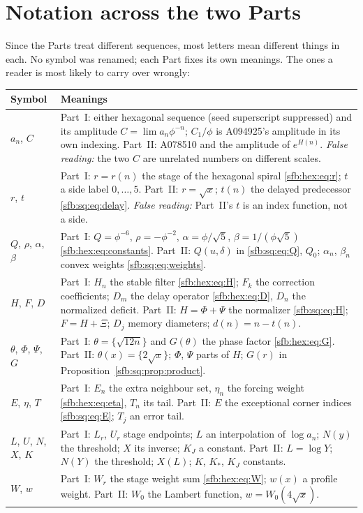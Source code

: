 \documentclass[11pt]{article}
\theoremstyle{remark}\newtheorem{remark}[theorem]{Remark}
\begin{document}
\section*{Notation across the two Parts}\label{sfb:sec:notation}
Since the Parts treat different sequences, most letters mean different things
in each. No symbol was renamed; each Part fixes its own meanings. The ones a
reader is most likely to carry over wrongly:
\begingroup\small
\renewcommand{\theHtable}{notation.\arabic{table}}
\begin{longtable}{@{}>{\raggedright\arraybackslash}p{} >{\raggedright\arraybackslash}p{}@{}}
\toprule
Symbol & Meanings\\
\midrule
\endhead
$a_n$, $C$ & Part~I: either hexagonal sequence (seed superscript suppressed) and its amplitude $C=\lim a_n\phi^{-n}$; $C_1/\phi$ is A094925's amplitude in its own indexing. Part~II: A078510 and the amplitude of $e^{H(n)}$. \emph{False reading:} the two $C$ are unrelated numbers on different scales.\\
$r$, $t$ & Part~I: $r=r(n)$ the stage of the hexagonal spiral \eqref{sfb:hex:eq:r}; $t$ a side label $0,\dots,5$. Part~II: $r=\sqrt x$; $t(n)$ the delayed predecessor \eqref{sfb:sq:eq:delay}. \emph{False reading:} Part~II's $t$ is an index function, not a side.\\
$Q$, $\rho$, $\alpha$, $\beta$ & Part~I: $Q=\phi^{-6}$, $\rho=-\phi^{-2}$, $\alpha=\phi/\sqrt5$, $\beta=1/(\phi\sqrt5)$ \eqref{sfb:hex:eq:constants}. Part~II: $Q(u,\delta)$ in \eqref{sfb:sq:eq:Q}, $Q_0$; $\alpha_n$, $\beta_n$ convex weights \eqref{sfb:sq:eq:weights}.\\
$H$, $F$, $D$ & Part~I: $H_n$ the stable filter \eqref{sfb:hex:eq:H}; $F_k$ the correction coefficients; $D_m$ the delay operator \eqref{sfb:hex:eq:D}, $D_n$ the normalized deficit. Part~II: $H=\Phi+\Psi$ the normalizer \eqref{sfb:sq:eq:H}; $F=H+\Xi$; $D_j$ memory diameters; $d(n)=n-t(n)$.\\
$\theta$, $\Phi$, $\Psi$, $G$ & Part~I: $\theta=\{\sqrt{12n}\}$ and $G(\theta)$ the phase factor \eqref{sfb:hex:eq:G}. Part~II: $\theta(x)=\{2\sqrt x\}$; $\Phi$, $\Psi$ parts of $H$; $G(r)$ in Proposition~\ref{sfb:sq:prop:product}.\\
$E$, $\eta$, $T$ & Part~I: $E_n$ the extra neighbour set, $\eta_n$ the forcing weight \eqref{sfb:hex:eq:eta}, $T_n$ its tail. Part~II: $E$ the exceptional corner indices \eqref{sfb:sq:eq:E}; $T_j$ an error tail.\\
$L$, $U$, $N$, $X$, $K$ & Part~I: $L_r$, $U_r$ stage endpoints; $L$ an interpolation of $\log a_n$; $N(y)$ the threshold; $X$ its inverse; $K_J$ a constant. Part~II: $L=\log Y$; $N(Y)$ the threshold; $X(L)$; $K$, $K_*$, $K_J$ constants.\\
$W$, $w$ & Part~I: $W_r$ the stage weight sum \eqref{sfb:hex:eq:W}; $w(x)$ a profile weight. Part~II: $W_0$ the Lambert function, $w=W_0(4\sqrt x)$.\\
\bottomrule
\end{longtable}
\addtocounter{table}{-1}%
\endgroup
\end{document}

